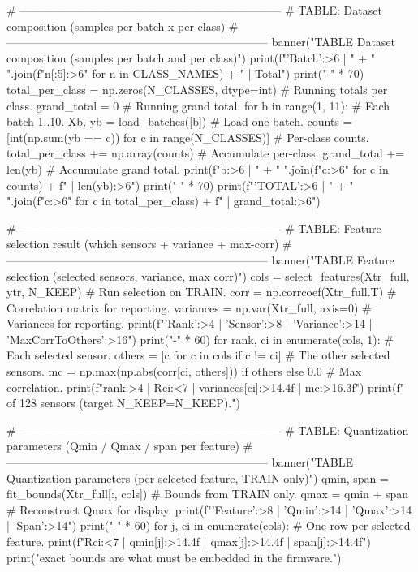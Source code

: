     # ---------------------------------------------------------------------
    # TABLE: Dataset composition  (samples per batch x per class)
    # ---------------------------------------------------------------------
    banner("TABLE  Dataset composition (samples per batch and per class)")
    print(f"{'Batch':>6} | " + " ".join(f"{n[:5]:>6}" for n in CLASS_NAMES) + " |  Total")
    print("-" * 70)
    total_per_class = np.zeros(N_CLASSES, dtype=int)  # Running totals per class.
    grand_total = 0                                   # Running grand total.
    for b in range(1, 11):                            # Each batch 1..10.
        Xb, yb = load_batches([b])                    # Load one batch.
        counts = [int(np.sum(yb == c)) for c in range(N_CLASSES)]  # Per-class counts.
        total_per_class += np.array(counts)           # Accumulate per-class.
        grand_total += len(yb)                        # Accumulate grand total.
        print(f"{b:>6} | " + " ".join(f"{c:>6}" for c in counts) + f" | {len(yb):>6}")
    print("-" * 70)
    print(f"{'TOTAL':>6} | " + " ".join(f"{c:>6}" for c in total_per_class) + f" | {grand_total:>6}")

    # ---------------------------------------------------------------------
    # TABLE: Feature selection result  (which sensors + variance + max-corr)
    # ---------------------------------------------------------------------
    banner("TABLE  Feature selection (selected sensors, variance, max corr)")
    cols = select_features(Xtr_full, ytr, N_KEEP)     # Run selection on TRAIN.
    corr = np.corrcoef(Xtr_full.T)                     # Correlation matrix for reporting.
    variances = np.var(Xtr_full, axis=0)              # Variances for reporting.
    print(f"{'Rank':>4} | {'Sensor':>8} | {'Variance':>14} | {'MaxCorrToOthers':>16}")
    print("-" * 60)
    for rank, ci in enumerate(cols, 1):               # Each selected sensor.
        others = [c for c in cols if c != ci]         # The other selected sensors.
        mc = np.max(np.abs(corr[ci, others])) if others else 0.0  # Max correlation.
        print(f"{rank:>4} | R{ci:<7} | {variances[ci]:>14.4f} | {mc:>16.3f}")
    print(f" of 128 sensors (target N_KEEP={N_KEEP}).")

    # ---------------------------------------------------------------------
    # TABLE: Quantization parameters  (Qmin / Qmax / span per feature)
    # ---------------------------------------------------------------------
    banner("TABLE  Quantization parameters (per selected feature, TRAIN-only)")
    qmin, span = fit_bounds(Xtr_full[:, cols])        # Bounds from TRAIN only.
    qmax = qmin + span                                # Reconstruct Qmax for display.
    print(f"{'Feature':>8} | {'Qmin':>14} | {'Qmax':>14} | {'Span':>14}")
    print("-" * 60)
    for j, ci in enumerate(cols):                     # One row per selected feature.
        print(f"R{ci:<7} | {qmin[j]:>14.4f} | {qmax[j]:>14.4f} | {span[j]:>14.4f}")
    print("\nThese exact bounds are what must be embedded in the firmware.")

